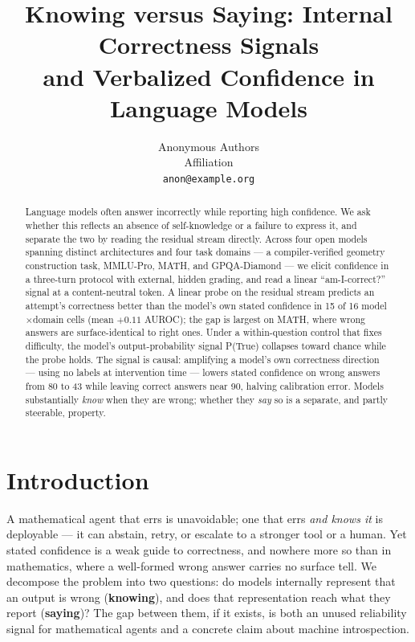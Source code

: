 \documentclass{article}
\title{Knowing versus Saying: Internal Correctness Signals \\ and Verbalized Confidence in Language Models}
\author{%
  Anonymous Authors\\
  Affiliation\\
  \texttt{anon@example.org}
}
\begin{document}
\maketitle

\begin{abstract}
Language models often answer incorrectly while reporting high confidence.
We ask whether this reflects an absence of self-knowledge or a failure to express it, and separate the two by reading the residual stream directly.
Across four open models spanning distinct architectures and four task domains --- a compiler-verified geometry construction task, MMLU-Pro, MATH, and GPQA-Diamond --- we elicit confidence in a three-turn protocol with external, hidden grading, and read a linear ``am-I-correct?'' signal at a content-neutral token.
A linear probe on the residual stream predicts an attempt's correctness better than the model's own stated confidence in 15 of 16 model$\times$domain cells (mean $+0.11$ AUROC); the gap is largest on MATH, where wrong answers are surface-identical to right ones.
Under a within-question control that fixes difficulty, the model's output-probability signal P(True) collapses toward chance while the probe holds.
The signal is causal: amplifying a model's own correctness direction --- using no labels at intervention time --- lowers stated confidence on wrong answers from 80 to 43 while leaving correct answers near 90, halving calibration error.
Models substantially \emph{know} when they are wrong; whether they \emph{say} so is a separate, and partly steerable, property.
\end{abstract}

\section{Introduction}
\label{sec:intro}

A mathematical agent that errs is unavoidable; one that errs \emph{and knows it} is deployable --- it can abstain, retry, or escalate to a stronger tool or a human.
Yet stated confidence is a weak guide to correctness, and nowhere more so than in mathematics, where a well-formed wrong answer carries no surface tell.
We decompose the problem into two questions: do models internally represent that an output is wrong (\textbf{knowing}), and does that representation reach what they report (\textbf{saying})?
The gap between them, if it exists, is both an unused reliability signal for mathematical agents and a concrete claim about machine introspection.
\end{document}
